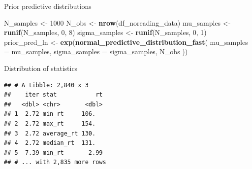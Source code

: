\documentclass[12pt,ignorenonframetext,aspectratio=169]{beamer}
\newenvironment{Shaded}{\begin{snugshade}}{\end{snugshade}}
\newcommand{\DataTypeTok}[1]{\textcolor[rgb]{0.13,0.29,0.53}{#1}}
\newcommand{\DecValTok}[1]{\textcolor[rgb]{0.00,0.00,0.81}{#1}}
\newcommand{\KeywordTok}[1]{\textcolor[rgb]{0.13,0.29,0.53}{\textbf{#1}}}
\newcommand{\NormalTok}[1]{#1}
\newcommand{\OperatorTok}[1]{\textcolor[rgb]{0.81,0.36,0.00}{\textbf{#1}}}
\newcommand{\StringTok}[1]{\textcolor[rgb]{0.31,0.60,0.02}{#1}}
\begin{document}
\begin{frame}[fragile]{Prior predictive distributions}
\protect\hypertarget{prior-predictive-distributions-1}{}

\small

\begin{Shaded}
\begin{Highlighting}[]
\NormalTok{N_samples <-}\StringTok{ }\DecValTok{1000}
\NormalTok{N_obs <-}\StringTok{ }\KeywordTok{nrow}\NormalTok{(df_noreading_data)}
\NormalTok{mu_samples <-}\StringTok{ }\KeywordTok{runif}\NormalTok{(N_samples, }\DecValTok{0}\NormalTok{, }\DecValTok{8}\NormalTok{)}
\NormalTok{sigma_samples <-}\StringTok{ }\KeywordTok{runif}\NormalTok{(N_samples, }\DecValTok{0}\NormalTok{, }\DecValTok{1}\NormalTok{)}
\NormalTok{prior_pred_ln <-}\StringTok{ }\KeywordTok{exp}\NormalTok{(}\KeywordTok{normal_predictive_distribution_fast}\NormalTok{(}
  \DataTypeTok{mu_samples =}\NormalTok{ mu_samples,}
  \DataTypeTok{sigma_samples =}\NormalTok{ sigma_samples,}
\NormalTok{  N_obs}
\NormalTok{))}
\end{Highlighting}
\end{Shaded}

\normalsize

\end{frame}

\begin{frame}[fragile]{Distribution of statistics}
\protect\hypertarget{distribution-of-statistics-1}{}

\scriptsize

\begin{Shaded}
\end{Shaded}

\begin{verbatim}
## # A tibble: 2,840 x 3
##    iter stat           rt
##   <dbl> <chr>       <dbl>
## 1  2.72 min_rt     106.  
## 2  2.72 max_rt     154.  
## 3  2.72 average_rt 130.  
## 4  2.72 median_rt  131.  
## 5  7.39 min_rt       2.99
## # ... with 2,835 more rows
\end{verbatim}

\normalsize

\end{frame}
\end{document}

